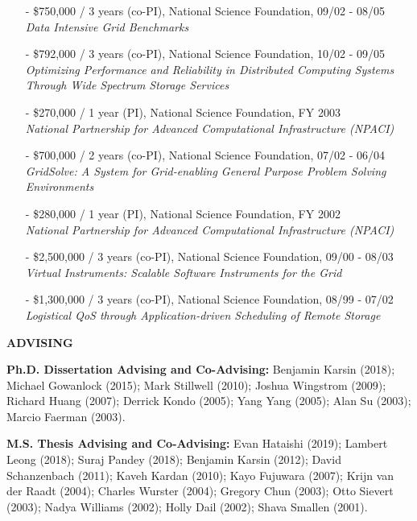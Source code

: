 \documentclass[times,11pt]{letter}
\begin{document}
\begin{itemize}
\item[-] \$750,000 / 3 years (co-PI), National Science Foundation, 09/02 - 08/05~\\
	{\it Data Intensive Grid Benchmarks}

\item[-] \$792,000 / 3 years (co-PI), National Science Foundation, 10/02 - 09/05~\\  
      {\it Optimizing Performance and Reliability in Distributed Computing Systems 
       Through Wide Spectrum Storage Services}

\item[-] \$270,000 / 1 year (PI), National Science Foundation, FY 2003~\\
      \emph{National Partnership for Advanced Computational Infrastructure (NPACI)}


\item[-] \$700,000 / 2 years (co-PI), National Science Foundation, 07/02 - 06/04~\\
      {\it GridSolve:  A System for Grid-enabling General Purpose Problem Solving Environments}

\item[-] \$280,000 / 1 year (PI), National Science Foundation, FY 2002~\\
      \emph{National Partnership for Advanced Computational Infrastructure (NPACI)}

\item[-] \$2,500,000 / 3 years (co-PI), National Science Foundation, 09/00 - 08/03~\\
{\it Virtual Instruments: Scalable Software Instruments for the Grid}

\item[-] \$1,300,000 / 3 years (co-PI), National Science Foundation, 08/99 - 07/02~\\
{\it Logistical QoS through Application-driven Scheduling of Remote Storage}

\end{itemize}

\noindent
{\large{\bf ADVISING}}


\noindent
{\bf Ph.D. Dissertation Advising and Co-Advising:}
 Benjamin Karsin (2018); 
 Michael Gowanlock (2015);
 Mark Stillwell (2010); 
 Joshua Wingstrom (2009);
 Richard Huang (2007); 
 Derrick Kondo (2005);
 Yang Yang (2005);
 Alan Su (2003);
 Marcio Faerman (2003).

\noindent
{\bf M.S. Thesis Advising and Co-Advising:}
 Evan Hataishi (2019);
 Lambert Leong (2018);
 Suraj Pandey (2018);
 Benjamin Karsin (2012);
 David Schanzenbach (2011);
 Kaveh Kardan (2010);
 Kayo Fujuwara (2007);
 Krijn van der Raadt (2004);
 Charles Wurster (2004);
 Gregory Chun (2003);
 Otto Sievert (2003);
 Nadya Williams (2002);
 Holly Dail (2002);
 Shava Smallen (2001).
\end{document}
